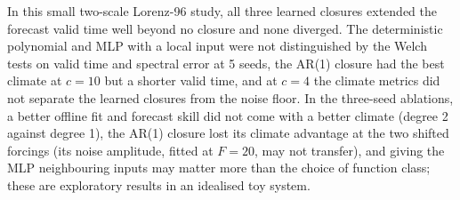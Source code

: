 In this small two-scale Lorenz-96 study, all three learned closures extended the forecast valid time well beyond no closure and none diverged. The deterministic polynomial and MLP with a local input were not distinguished by the Welch tests on valid time and spectral error at 5 seeds, the AR(1) closure had the best climate at $c{=}10$ but a shorter valid time, and at $c{=}4$ the climate metrics did not separate the learned closures from the noise floor. In the three-seed ablations, a better offline fit and forecast skill did not come with a better climate (degree 2 against degree 1), the AR(1) closure lost its climate advantage at the two shifted forcings (its noise amplitude, fitted at $F{=}20$, may not transfer), and giving the MLP neighbouring inputs may matter more than the choice of function class; these are exploratory results in an idealised toy system.
